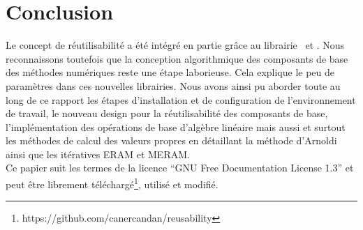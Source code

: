 %

\section{Conclusion}

Le concept de réutilisabilité a été intégré en partie grâce au librairie \petscx\ et \slepcx. Nous reconnaissons toutefois que la conception algorithmique des composants de base des méthodes numériques reste une étape laborieuse. Cela explique le peu de paramètres dans ces nouvelles librairies. Nous avons ainsi pu aborder toute au long de ce rapport les étapes d'installation et de configuration de l'environnement de travail, le nouveau design pour la réutilisabilité des composants de base, l'implémentation des opérations de base d'algèbre linéaire mais aussi et surtout les méthodes de calcul des valeurs propres en détaillant la méthode d'Arnoldi ainsi que les itératives ERAM et MERAM.\\

Ce papier suit les termes de la licence ``GNU Free Documentation License 1.3'' et peut être librement téléchargé\footnote{https://github.com/canercandan/reusability}, utilisé et modifié.
